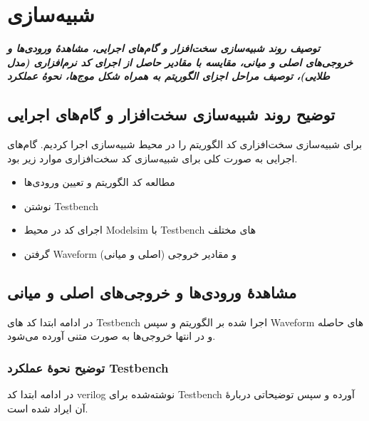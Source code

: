 \chapter{شبیه‌سازی}
\noindent
\textbf{
	\textit{
		توصیف روند شبیه‌سازی سخت‌افزار و گام‌های اجرایی، مشاهدهٔ ورودی‌ها و خروجی‌های اصلی و میانی، مقایسه با مقادیر حاصل از اجرای کد نرم‌افزاری (مدل طلایی)، توصیف مراحل اجزای الگوریتم به همراه شکل موج‌ها، نحوهٔ عملکرد 
	}
}
\pagebreak

\section{توضیح روند شبیه‌سازی سخت‌افزار و گام‌های اجرایی}
برای شبیه‌سازی سخت‌افزاری کد 
الگوریتم 
را در محیط شبیه‌سازی 
اجرا کردیم. گام‌های اجرایی به صورت کلی برای شبیه‌سازی کد سخت‌افزاری موارد زیر بود. 
\begin{itemize}
	\item
	      مطالعه کد الگوریتم و تعیین ورودی‌ها
	\item
	      نوشتن Testbench
	\item
	      اجرای کد در محیط Modelsim با Testbench های مختلف
	\item
	      گرفتن Waveform و مقادیر خروجی (اصلی و میانی)
\end{itemize}
\section{مشاهدهٔ ورودی‌ها و خروجی‌های اصلی و میانی}
در ادامه ابتدا کد های Testbench اجرا شده بر الگوریتم و سپس Waveform
های حاصله و در انتها خروجی‌ها به صورت متنی آورده می‌شود.

\subsection{توضیح نحوهٔ عملکرد Testbench}
در ادامه ابتدا کد verilog نوشته‌شده برای  Testbench آورده  و سپس توضیحاتی دربارهٔ آن ایراد شده است. 
\pagebreak
\subsubsection{}
\pagebreak
